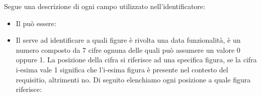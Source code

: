 \noindent
Segue una descrizione di ogni campo utilizzato nell'identificatore:
\begin{itemize}
	\item Il  può essere:

	\item Il  serve ad identificare a quali figure è rivolta una data funzionalità, è un numero composto da 7 cifre ognuna delle quali può assumere un valore 0 oppure 1. La posizione della cifra si riferisce ad una specifica figura, se la cifra i-esima vale 1 significa che l'i-esima figura è presente nel contesto del requisitio, altrimenti no.
	Di seguito elenchiamo ogni posizione a quale figura riferisce: 


\end{itemize}
